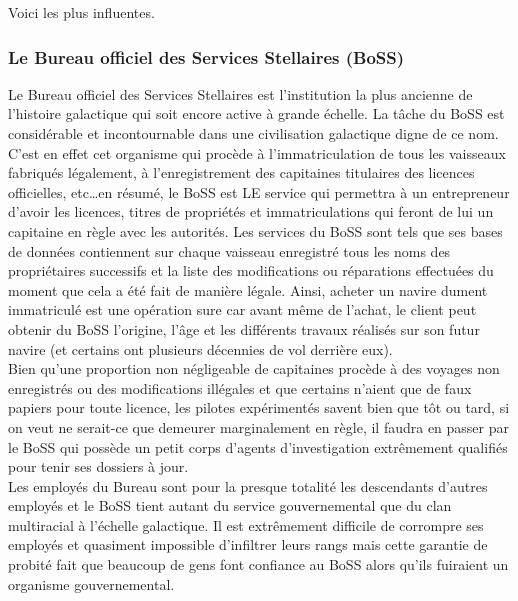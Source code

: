 \documentclass[twoside]{article}
\begin{document}
Voici les plus influentes.

\subsubsection{Le Bureau officiel des Services Stellaires (BoSS)}
Le Bureau officiel des Services Stellaires est l'institution la plus ancienne de l'histoire galactique qui soit encore active à grande échelle. La tâche du BoSS est considérable et incontournable dans une civilisation galactique digne de ce nom. C'est en effet cet organisme qui procède à l'immatriculation de tous les vaisseaux fabriqués légalement, à l'enregistrement des capitaines titulaires des licences officielles, etc\ldots en résumé, le BoSS est LE service qui permettra à un entrepreneur d'avoir les licences, titres de propriétés et immatriculations qui feront de lui un capitaine en règle avec les autorités. Les services du BoSS sont tels que ses bases de données contiennent sur chaque vaisseau enregistré tous les noms des propriétaires successifs et la liste des modifications ou réparations effectuées du moment que cela a été fait de manière légale. Ainsi, acheter un navire dument immatriculé est une opération sure car avant même de l'achat, le client peut obtenir du BoSS l'origine, l'âge et les différents travaux réalisés sur son futur navire (et certains ont plusieurs décennies de vol derrière eux).\\

Bien qu'une proportion non négligeable de capitaines procède à des voyages non enregistrés ou des modifications illégales et que certains n'aient que de faux papiers pour toute licence, les pilotes expérimentés savent bien que tôt ou tard, si on veut ne serait-ce que demeurer marginalement en règle, il faudra en passer par le BoSS qui possède un petit corps d'agents d'investigation extrêmement qualifiés pour tenir ses dossiers à jour.\\

Les employés du Bureau sont pour la presque totalité les descendants d'autres employés et le BoSS tient autant du service gouvernemental que du clan multiracial à l'échelle galactique. Il est extrêmement difficile de corrompre ses employés et quasiment impossible d'infiltrer leurs rangs mais cette garantie de probité fait que beaucoup de gens font confiance au BoSS alors qu'ils fuiraient un organisme gouvernemental.\\
\end{document}
